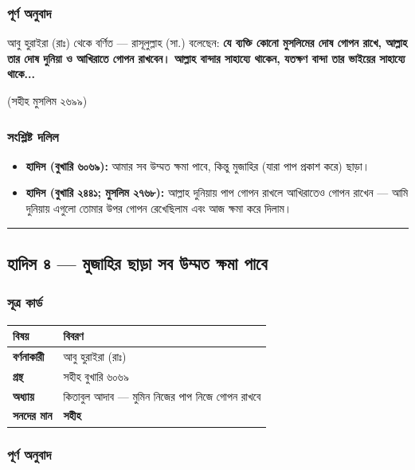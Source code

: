 \subsubsection*{পূর্ণ অনুবাদ}

আবু হুরাইরা (রাঃ) থেকে বর্ণিত — রাসূলুল্লাহ (সা.) বলেছেন: \textbf{যে ব্যক্তি কোনো মুসলিমের দোষ গোপন রাখে, আল্লাহ তার দোষ দুনিয়া ও আখিরাতে গোপন রাখবেন। আল্লাহ বান্দার সাহায্যে থাকেন, যতক্ষণ বান্দা তার ভাইয়ের সাহায্যে থাকে...}

(সহীহ মুসলিম ২৬৯৯)

\subsubsection*{সংশ্লিষ্ট দলিল}

\begin{itemize}
\item \textbf{হাদিস (বুখারি ৬০৬৯):} আমার সব উম্মত ক্ষমা পাবে, কিন্তু মুজাহির (যারা পাপ প্রকাশ করে) ছাড়া।
\item \textbf{হাদিস (বুখারি ২৪৪১; মুসলিম ২৭৬৮):} আল্লাহ দুনিয়ায় পাপ গোপন রাখলে আখিরাতেও গোপন রাখেন — আমি দুনিয়ায় এগুলো তোমার উপর গোপন রেখেছিলাম এবং আজ ক্ষমা করে দিলাম।
\end{itemize}
\medskip\hrule\medskip

\subsection*{হাদিস ৪ — মুজাহির ছাড়া সব উম্মত ক্ষমা পাবে}

\subsubsection*{সূত্র কার্ড}

\begin{table}[h]\centering\small
\begin{tabular}{ll}
বিষয় & বিবরণ \\
\hline
\textbf{বর্ণনাকারী} & আবু হুরাইরা (রাঃ) \\
\textbf{গ্রন্থ} & সহীহ বুখারি ৬০৬৯ \\
\textbf{অধ্যায়} & কিতাবুল আদাব — \lat{“}মুমিন নিজের পাপ নিজে গোপন রাখবে\lat{”} \\
\textbf{সনদের মান} & \textbf{সহীহ} \\
\hline
\end{tabular}
\end{table}

\subsubsection*{পূর্ণ অনুবাদ}


